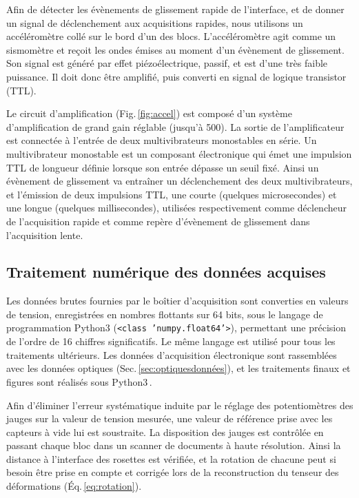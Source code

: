 Afin de détecter les évènements de glissement rapide de l'interface, et de donner un signal de déclenchement aux acquisitions rapides, nous utilisons un accéléromètre collé sur le bord d'un des blocs. L'accéléromètre agit comme un sismomètre et reçoit les ondes émises au moment d'un évènement de glissement. Son signal est généré par effet piézoélectrique, passif, et est d'une très faible puissance. Il doit donc être amplifié, puis converti en signal de logique transistor (TTL).

Le circuit d'amplification (Fig.\,\ref{fig:accel}) est composé d'un système d'amplification de grand gain réglable (jusqu'à 500). La sortie de l'amplificateur est connectée à l'entrée de deux multivibrateurs monostables en série. Un multivibrateur monostable est un composant électronique qui émet une impulsion TTL de longueur définie lorsque son entrée dépasse un seuil fixé. Ainsi un évènement de glissement va entraîner un déclenchement des deux multivibrateurs, et l'émission de deux impulsions TTL, une courte (quelques microsecondes) et une longue (quelques millisecondes), utilisées respectivement comme déclencheur de l'acquisition rapide et comme repère d'évènement de glissement dans l'acquisition lente.






\subsection{Traitement numérique des données acquises}
\label{sec:electroniquedonnées}

Les données brutes fournies par le boîtier d'acquisition sont converties en valeurs de tension, enregistrées en nombres flottants sur 64 bits, sous le langage de programmation Python3 (\texttt{<class 'numpy.float64'>}), permettant une précision de l'ordre de 16 chiffres significatifs. Le même langage est utilisé pour tous les traitements ultérieurs. Les données d'acquisition électronique sont rassemblées avec les données optiques (Sec.\,\ref{sec:optiquesdonnées}), et les traitements finaux et figures sont réalisés sous Python3\,\cite{van_rossum_python_2009, harris_array_2020,hunter_matplotlib_2007}.

Afin d'éliminer l'erreur systématique induite par le réglage des potentiomètres des jauges sur la valeur de tension mesurée, une valeur de référence prise avec les capteurs à vide lui est soustraite. La disposition des jauges est contrôlée en passant chaque bloc dans un scanner de documents à haute résolution. Ainsi la distance à l'interface des rosettes est vérifiée, et  la rotation de chacune peut si besoin être prise en compte et corrigée lors de la reconstruction du tenseur des déformations (Éq.\,\ref{eq:rotation}).

